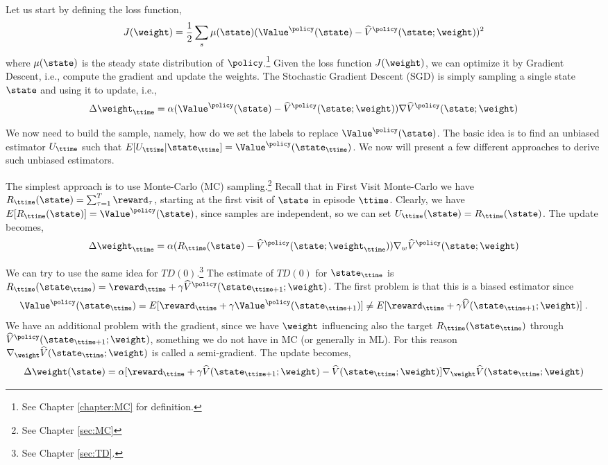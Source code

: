 Let us start by defining the loss function,
\[
J(\weight)=\frac{1}{2}\sum_s
\mu(\state)(\Value^\policy(\state)-\widehat{V}^\policy(\state;\weight))^2
\]
where $\mu(\state)$ is the steady state distribution of
$\policy$.\footnote{See Chapter \ref{chapter:MC} for definition.} Given the loss function $J(\weight)$, we can optimize it by Gradient Descent, i.e., compute the gradient and update the weights. The Stochastic
Gradient Descent (SGD) is simply sampling a single state $\state$
and using it to update, i.e.,
\[
\Delta \weight_\ttime = \alpha (\Value^\policy
(\state)-\widehat{V}^\policy(\state;\weight))\nabla
\widehat{V}^\policy (\state;\weight)
\]

We now need to build the sample, namely, how do we set the labels to
replace $\Value^\policy (\state)$. The basic idea is to find an
unbiased estimator $U_\ttime$ such that $E[U_\ttime
|\state_\ttime]=\Value^\policy(\state_\ttime)$. We now will present
a few different approaches to derive such unbiased estimators.

The simplest approach is to use Monte-Carlo (MC)
sampling.\footnote{See Chapter \ref{sec:MC}} Recall that in First
Visit Monte-Carlo we have $R_\ttime(\state)=\sum_{\tau=1}^T
\reward_\tau$, starting at the first visit of $\state$ in episode
$\ttime$. Clearly, we have
$E[R_\ttime(\state)]=\Value^\policy(\state)$, since samples are
independent, so we can set $U_\ttime(\state)=R_\ttime(\state)$. The
update becomes,
\[
\Delta \weight_\ttime = \alpha
(R_\ttime(\state)-\widehat{V}^\policy(\state;\weight_\ttime))\nabla_{w}
\widehat{V}^\policy (\state;\weight)
\]

We can try to use the same idea for $TD(0)$.\footnote{See Chapter
\ref{sec:TD}.} The estimate of $TD(0)$ for $\state_\ttime$ is
$R_\ttime(\state_\ttime)=\reward_\ttime+\gamma
\widehat{V}^\policy(\state_{\ttime+1};\weight)$. The first problem
is that this is a biased estimator since
\[
\Value^\policy(\state_\ttime)=E[\reward_\ttime+\gamma
\Value^\policy(\state_{\ttime+1})]\neq E[\reward_\ttime+\gamma
\widehat{V}(\state_{\ttime+1};\weight)]\;.
\]
We have an additional problem with the gradient, since we have
$\weight$ influencing also the target $R_\ttime(\state_\ttime)$
through $\widehat{V}^\policy(\state_{\ttime+1};\weight)$, something
we do not have in MC (or generally in ML). For this reason
$\nabla_\weight \widehat{V}(\state_\ttime;\weight)$ is called a
semi-gradient. The update becomes,
\[
\Delta \weight (\state)= \alpha[\reward_\ttime +\gamma
\widehat{V}(\state_{\ttime+1};\weight)-\widehat{V}(\state_\ttime;\weight)]\nabla_\weight
\widehat{V}(\state_\ttime;\weight)
\]

